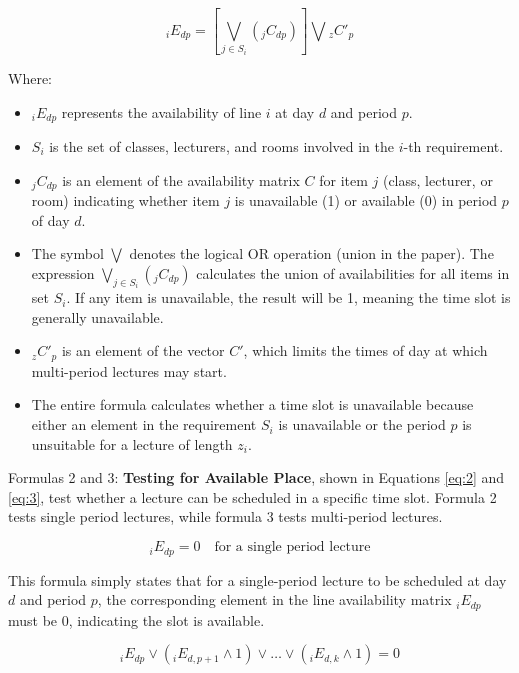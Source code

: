 \begin{equation}
\label{eq:1}
_iE_{dp} = \left[\bigvee_{j \in S_i} (_jC_{dp})\right] \bigvee {}_zC'_{p}
\end{equation}

Where:
\begin{itemize}
    \item \( _iE_{dp} \) represents the availability of line \( i \) at day \( d \) and period \( p \).
    \item \( S_i \) is the set of classes, lecturers, and rooms involved in the \( i \)-th requirement.
    \item \( _jC_{dp} \) is an element of the availability matrix \( C \) for item \( j \) (class, lecturer, or room) indicating whether item \( j \) is unavailable (1) or available (0) in period \( p \) of day \( d \).
    \item The symbol \(\bigvee\) denotes the logical OR operation (union in the paper).
	The expression \(\bigvee_{j \in S_i} (_jC_{dp})\) calculates the union of availabilities for all items in set \( S_i \).
	If any item is unavailable, the result will be 1, meaning the time slot is generally unavailable.
    \item \( _zC'_{p} \) is an element of the vector \( C' \), which limits the times of day at which multi-period lectures may start. 
    \item The entire formula calculates whether a time slot is unavailable because either an element in the requirement \( S_i \) is unavailable or the period \( p \) is unsuitable for a lecture of length \( z_i \).
\end{itemize}

Formulas 2 and 3: \textbf{Testing for Available Place}, shown in Equations \ref{eq:2} and \ref{eq:3}, test whether a lecture can be scheduled in a specific time slot.
Formula 2 tests single period lectures, while formula 3 tests multi-period lectures.

\begin{equation}
\label{eq:2}
_iE_{dp} = 0 \quad \text{for a single period lecture}
\end{equation}

This formula simply states that for a single-period lecture to be scheduled at day \( d \) and period \( p \), the corresponding element in the line availability matrix \( _iE_{dp} \) must be 0, indicating the slot is available.

\begin{equation}
\label{eq:3}
_iE_{dp} \vee (_iE_{d,p+1} \wedge 1) \vee \dots \vee (_iE_{d,k} \wedge 1) = 0
\end{equation}

